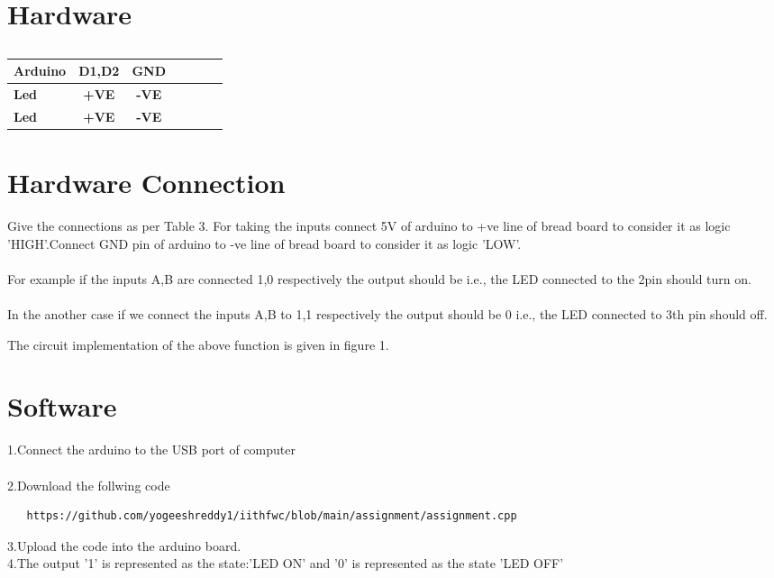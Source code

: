 \documentclass[10pt, a4paper]{article}
\begin{document}
\begin{table}[htbp]


   
    \section{Hardware}
\begin{center}
    \begin{tabular}{|l|c|c|c|c|c|c|} \hline 
 \textbf{Arduino} & \textbf{D1,D2} & \textbf{GND} \\ \hline
 \textbf{Led} & \textbf{+VE} & \textbf{-VE}\\ \hline
 \textbf{Led} & \textbf{+VE} & \textbf{-VE}\\ \hline
\end{tabular}   
\end{center}
\caption{\label{table:dummytable}}
\end{table}
   
   \section{Hardware Connection}
   Give the connections as per Table 3. For taking the inputs connect 5V of arduino to +ve line of bread board to consider it as logic 'HIGH'.Connect GND pin of arduino to -ve line of bread board to consider it as logic 'LOW'.
\\
\\
For example if the inputs A,B are connected 1,0 respectively the output should be  i.e., the LED connected to the  2pin should turn on.
\\
\\
In the another case if we connect the inputs A,B to 1,1 respectively the output should be 0 i.e., the LED connected to 3th pin should off.

  The circuit implementation of the above function is given in figure 1.
\section{Software}
  1.Connect the arduino to the USB port of computer
  \\
  \\2.Download the follwing code
  \\
  \begin{lstlisting}
   https://github.com/yogeeshreddy1/iithfwc/blob/main/assignment/assignment.cpp
  \end{lstlisting}
  
  3.Upload the code into the arduino board.
  \\4.The output '1' is represented as the state:'LED ON' and '0' is represented as the state 'LED OFF'



   
   
 
\end{document}
